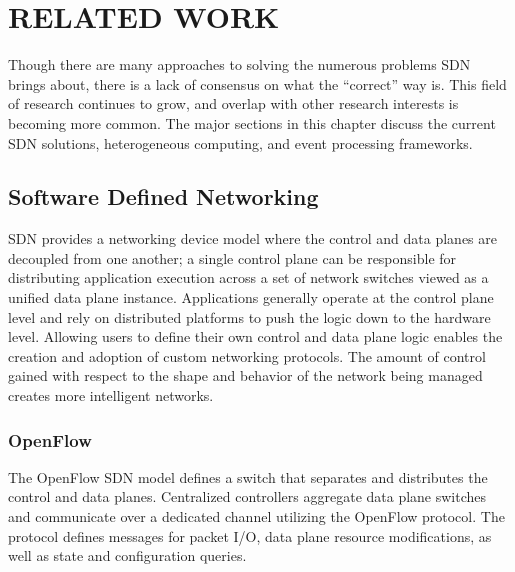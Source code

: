 \chapter{RELATED WORK}
\label{related}
Though there are many
approaches to solving the numerous problems SDN brings about, there
is a lack of consensus on what the ``correct'' way is. This field of research
continues to grow, and overlap with other research interests is becoming more
common. The major sections in this chapter discuss the current SDN solutions,
heterogeneous computing, and event processing frameworks.

\section{Software Defined Networking}
\label{related:sdn}
SDN provides a networking device model where the control and data planes are
decoupled from one another; a single control plane can be responsible for
distributing application execution across a set of network switches viewed as
a unified data plane instance. Applications generally operate at the control
plane level and rely on distributed platforms to push the logic down to the
hardware level. Allowing users to define their own control and data plane
logic enables the creation and adoption of custom networking protocols. The
amount of control gained with respect to the shape and behavior of the network
being managed creates more intelligent networks.


\subsection{OpenFlow}
\label{related:of}
The OpenFlow \cite{openflow} SDN model defines a switch that separates and
distributes the control and data planes. Centralized controllers aggregate
data plane switches and communicate over a dedicated channel utilizing the
OpenFlow protocol. The protocol defines messages for packet I/O, data plane
resource modifications, as well as state and configuration queries.

